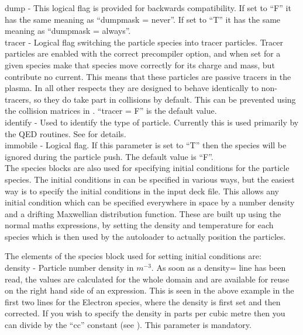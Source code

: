 {\emphtext dump} - This logical flag is provided for backwards compatibility.
If set to ``F'' it has the same meaning as ``dumpmask = never''. If set to
``T'' it has the same meaning as ``dumpmask = always''.\\

{\emphtext tracer} - Logical flag switching the particle species
into tracer particles. Tracer particles are enabled with the correct
precompiler option, and when set for a given species make that species move
correctly for its charge and mass, but contribute no current. This means that
these particles are passive tracers in the plasma. In all other respects they
are designed to behave identically to non-tracers, so they do take part in
collisions by default. This can be prevented using the collision matrices in
. ``tracer = F'' is the default value.\\

{\emphtext identify} - Used to identify the type of particle. Currently this
is used primarily by the QED routines. See  for details.\\

{\emphtext immobile} - Logical flag. If this parameter is set to ``T'' then
the species will be ignored during the particle push. The default value
is ``F''.\\

The species blocks are also used for specifying initial conditions for
the particle species. The initial conditions in {\EPOCH} can be specified in
various ways, but the easiest way is to specify the initial conditions in the
input deck file. This allows any initial condition which can be specified
everywhere in space by a number density and a drifting Maxwellian distribution
function.
These are built up using the normal maths
expressions, by setting the density and temperature for each species which is
then used by the autoloader to actually position the particles.

The elements of the species block used for setting
initial conditions are:\\

{\emphtext density} - Particle number density in $m^{-3}$.
As soon as a density= line has been read, the values are
calculated for the whole domain and are available for reuse on the right hand
side of an expression. This is seen in the above example in the first two lines
for the Electron species, where the density is first set and then corrected.
If you wish to specify the density in parts per cubic metre then you can
divide by the ``cc'' constant (see ).
This parameter is mandatory.\\

